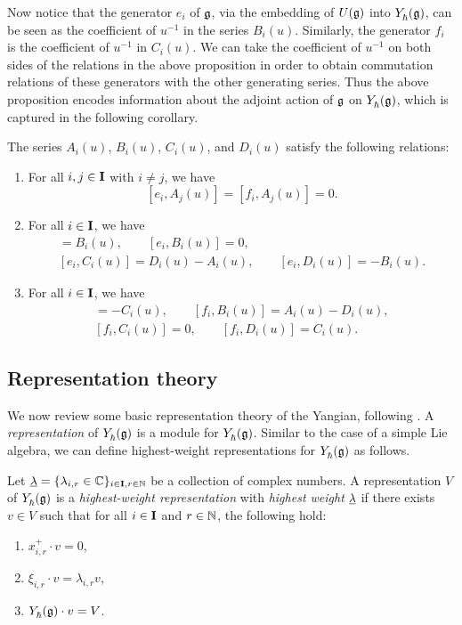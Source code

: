 Now notice that the generator $e_i$ of $\mathfrak{g}$, via the embedding of $U(\mathfrak{g})$ into $Y_\hbar^{}(\mathfrak{g})$, can be seen as the coefficient of $u^{-1}$ in the series $B_i(u)$.
Similarly, the generator $f_i$ is the coefficient of $u^{-1}$ in $C_i(u)$.
We can take the coefficient of $u^{-1}$ on both sides of the relations in the above proposition in order to obtain commutation relations of these generators with the other generating series.
Thus the above proposition encodes information about the adjoint action of $\mathfrak{g}$ on $Y_\hbar^{}(\mathfrak{g})$, which is captured in the following corollary.

\begin{corollary}\label{C:GKLO}
    The series $A_i(u)$, $B_i(u)$, $C_i(u)$, and $D_i(u)$ satisfy the following relations:
    \begin{enumerate}
        \item For all $i,j\in\mathbf{I}$ with $i\neq j$, we have
        \[[e_i,A_j(u)] = [f_i,A_j(u)] = 0.\]
        \item For all $i\in\mathbf{I}$, we have
        \begin{gather*}
            [e_i,A_i(u)] = B_i(u), \qquad [e_i,B_i(u)] = 0, \\
            [e_i,C_i(u)] = D_i(u)-A_i(u), \qquad [e_i,D_i(u)] = -B_i(u).
        \end{gather*}
        \item For all $i\in\mathbf{I}$, we have
        \begin{gather*}
            [f_i,A_i(u)] = -C_i(u), \qquad [f_i,B_i(u)] = A_i(u)-D_i(u), \\
            [f_i,C_i(u)] = 0, \qquad [f_i,D_i(u)] = C_i(u).
        \end{gather*}
    \end{enumerate}
\end{corollary}


\subsection{Representation theory}

We now review some basic representation theory of the Yangian, following \cite{chari_guide_1995}.
A \emph{representation} of $Y_\hbar^{}(\mathfrak{g})$ is a module for $Y_\hbar^{}(\mathfrak{g})$.
Similar to the case of a simple Lie algebra, we can define highest-weight representations for $Y_\hbar^{}(\mathfrak{g})$ as follows.

\begin{definition}\label{D:hw-Y}
    Let $\underline{\lambda}=\{\lambda_{i,r}\in\mathbb{C}\}_{i\in\mathbf{I},r\in\mathbb{N}}$ be a collection of complex numbers.
    A representation $V$ of $Y_\hbar^{}(\mathfrak{g})$ is a \emph{highest-weight representation} with \emph{highest weight} $\underline{\lambda}$ if there exists $v\in V$ such that for all $i\in\mathbf{I}$ and $r\in\mathbb{N}$, the following hold:
    \begin{enumerate}
        \item $x^+_{i,r}\cdot v = 0$,
        \item $\xi_{i,r}\cdot v = \lambda_{i,r}v$,
        \item $Y_\hbar^{}(\mathfrak{g})\cdot v = V$.
    \end{enumerate}
\end{definition}

